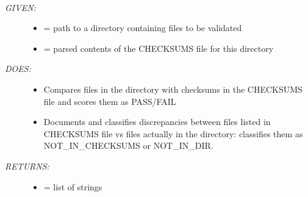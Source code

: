 \documentclass[letterpaper,10pt,english]{sphinxmanual}
\begin{document}
\begin{fulllineitems}
\label{code:gfunc.ensembl_data.check_files}~\begin{description}
\item[{\emph{GIVEN:}}] \leavevmode\begin{itemize}
\item {} 
 = path to a directory containing files to be validated

\item {} 
 = parsed contents of the CHECKSUMS file for this directory

\end{itemize}

\item[{\emph{DOES:}}] \leavevmode\begin{itemize}
\item {} 
Compares files in the directory with checksums in the CHECKSUMS file and scores them as PASS/FAIL

\item {} 
Documents and classifies discrepancies between files listed in CHECKSUMS file vs files actually
in the directory: classifies them as NOT\_IN\_CHECKSUMS or NOT\_IN\_DIR.

\end{itemize}

\item[{\emph{RETURNS:}}] \leavevmode\begin{itemize}
\item {} 
 = list of strings

\end{itemize}

\end{description}

\end{fulllineitems}

\end{document}
